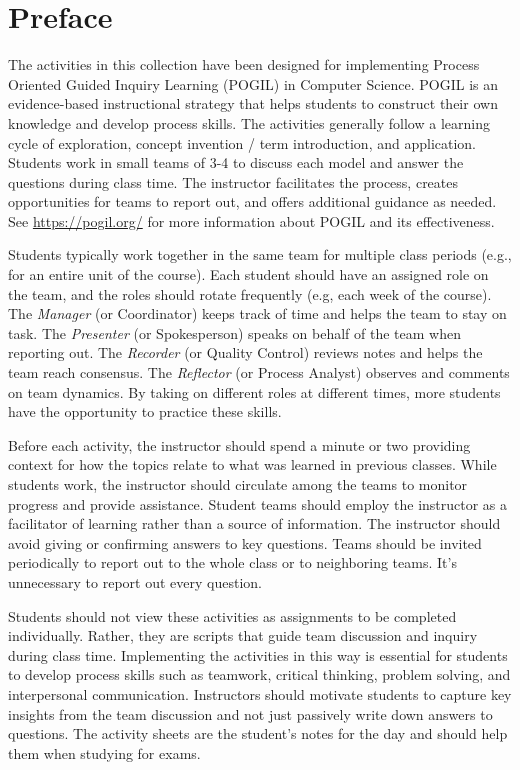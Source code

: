 \chapter*{Preface}
\thispagestyle{empty}

The activities in this collection have been designed for implementing Process Oriented Guided Inquiry Learning (POGIL) in Computer Science. POGIL is an evidence-based instructional strategy that helps students to construct their own knowledge and develop process skills. The activities generally follow a learning cycle of exploration, concept invention / term introduction, and application. Students work in small teams of 3-4 to discuss each model and answer the questions during class time. The instructor facilitates the process, creates opportunities for teams to report out, and offers additional guidance as needed. See \url{https://pogil.org/} for more information about POGIL and its effectiveness.

\bigskip

Students typically work together in the same team for multiple class periods (e.g., for an entire unit of the course). Each student should have an assigned role on the team, and the roles should rotate frequently (e.g, each week of the course). The \textit{Manager} (or Coordinator) keeps track of time and helps the team to stay on task. The \textit{Presenter} (or Spokesperson) speaks on behalf of the team when reporting out. The \textit{Recorder} (or Quality Control) reviews notes and helps the team reach consensus. The \textit{Reflector} (or Process Analyst) observes and comments on team dynamics. By taking on different roles at different times, more students have the opportunity to practice these skills.

\bigskip

Before each activity, the instructor should spend a minute or two providing context for how the topics relate to what was learned in previous classes. While students work, the instructor should circulate among the teams to monitor progress and provide assistance. Student teams should employ the instructor as a facilitator of learning rather than a source of information. The instructor should avoid giving or confirming answers to key questions. Teams should be invited periodically to report out to the whole class or to neighboring teams. It's unnecessary to report out every question.

\bigskip

Students should not view these activities as assignments to be completed individually. Rather, they are scripts that guide team discussion and inquiry during class time. Implementing the activities in this way is essential for students to develop process skills such as teamwork, critical thinking, problem solving, and interpersonal communication. Instructors should motivate students to capture key insights from the team discussion and not just passively write down answers to questions. The activity sheets are the student's notes for the day and should help them when studying for exams.

